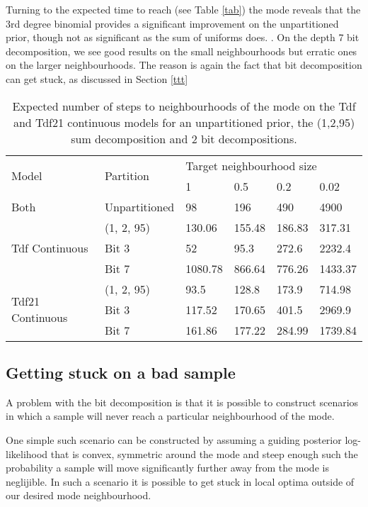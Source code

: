 Turning to the expected time to reach (see Table \ref{tab}) the mode reveals that the 3rd degree binomial provides a significant improvement on the unpartitioned prior, though not as significant as the sum of uniforms does. . On the depth 7 bit decomposition, we see good results on the small neighbourhoods but erratic ones on the larger neighbourhoods. The reason is again the fact that bit decomposition can get stuck, as discussed in Section \ref{ttt}

\begin{table}[H]
  \centering
  \begin{tabular}{llllll}
    \toprule
    \multirow{2}{*}{Model} & \multirow{2}{*}{Partition} & \multicolumn{4}{l}{Target neighbourhood size} \\
    \cmidrule(r){3-6} 
    & & 1 & 0.5 & 0.2 & 0.02 \\
    \midrule
    Both & Unpartitioned & 98 & 196 & 490 & 4900 \\
    \midrule
    \multirow{3}{*}{Tdf Continuous} & (1, 2, 95) & 130.06 & 155.48  & 186.83 & 317.31 \\
    & Bit 3 & 52 & 95.3  & 272.6 & 2232.4 \\
    & Bit 7 & 1080.78 & 866.64 & 776.26 & 1433.37 \\
    \midrule
    \multirow{3}{*}{Tdf21 Continuous} & (1, 2, 95) & 93.5 & 128.8  & 173.9 & 714.98 \\
    & Bit 3 & 117.52 & 170.65  & 401.5 & 2969.9 \\
    & Bit 7 & 161.86 & 177.22 & 284.99 & 1739.84 \\
    \bottomrule
  \end{tabular}
  \caption{Expected number of steps to neighbourhoods of the mode on the Tdf and Tdf21 continuous models for an unpartitioned prior, the (1,2,95) sum decomposition and 2 bit decompositions.}
  \label{tab:bestParts}
\end{table}

\subsection{Getting stuck on a bad sample}
A problem with the bit decomposition is that it is possible to construct scenarios in which a sample will never reach a particular neighbourhood of the mode.

One simple such scenario can be constructed by assuming a guiding posterior log-likelihood that is convex, symmetric around the mode and steep enough such the probability a sample will move significantly further away from the mode is neglijible. In such a scenario it is possible to get stuck in local optima outside of our desired mode neighbourhood.

